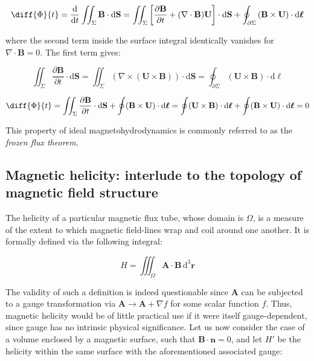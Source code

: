 \begin{equation}
    \diff{\Phi}{t}=\frac{\mathrm{d}}{\mathrm{d}t}\iint_\Sigma\mathbf{B}\cdot\mathrm{d}\mathbf{S}=\iint_\Sigma\left[\frac{\partial\mathbf{B}}{\partial t}+(\nabla\cdot\mathbf{B})\mathbf{U}\right]\cdot\mathrm{d}\mathbf{S}+\oint_{\partial\Sigma}\left(\mathbf{B}\times\mathbf{U}\right)\cdot\mathrm{d}\boldsymbol{\ell}
\end{equation}

where the second term inside the surface integral identically vanishes for $\nabla\cdot\mathbf{B}=0$. The first term gives:

\begin{equation}
    \iint_\Sigma\frac{\partial\mathbf{B}}{\partial t}\cdot\mathrm{d}\mathbf{S}=\iint_{\Sigma}\left(\nabla\times(\mathbf{U}\times\mathbf{B})\right)\cdot\mathrm{d}\mathbf{S}=\oint_{\partial\Sigma}(\mathbf{U}\times\mathbf{B})\cdot\mathrm{d}\boldsymbol{\ell}
\end{equation}

\begin{equation}
    \diff{\Phi}{t}=\iint_\Sigma\frac{\partial\mathbf{B}}{\partial t}\cdot\mathrm{d}\mathbf{S}+\oint(\mathbf{B}\times\mathbf{U})\cdot\mathrm{d}\boldsymbol{\ell}=\oint(\mathbf{U}\times\mathbf{B})\cdot\mathrm{d}\boldsymbol{\ell}+\oint(\mathbf{B}\times\mathbf{U})\cdot\mathrm{d}\boldsymbol{\ell}=0
\end{equation}

This property of ideal magnetohydrodynamics is commonly referred to as the \textit{frozen flux theorem}.

\subsection{Magnetic helicity: interlude to the topology of magnetic field structure}

The helicity of a particular magnetic flux tube, whose domain is $\Omega$, is a measure of the extent to which magnetic field-lines wrap and coil around one another. It is formally defined via the following integral:

\begin{equation}
    H=\iiint_\Omega\mathbf{A}\cdot\mathbf{B}\,\mathrm{d}^3\mathbf{r}
\end{equation}

The validity of such a definition is indeed questionable since $\mathbf{A}$ can be subjected to a gauge transformation via $\mathbf{A}\to\mathbf{A}+\nabla f$ for some scalar function $f$. Thus, magnetic helicity would be of little practical use if it were itself gauge-dependent, since gauge has no intrinsic physical significance. Let us now consider the case of a volume enclosed by a magnetic surface, such that $\mathbf{B}\cdot\mathbf{n}=0$, and let $H'$ be the helicity within the same surface with the aforementioned associated gauge:

